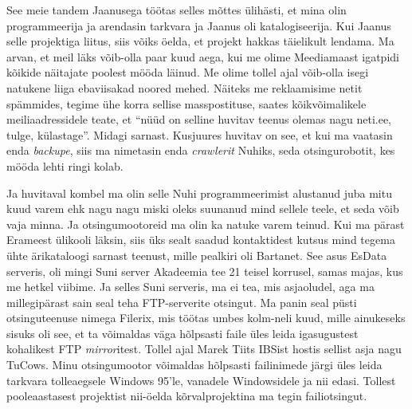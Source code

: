 
See meie tandem Jaanusega töötas selles mõttes ülihästi, et mina olin  
programmeerija ja arendasin tarkvara ja Jaanus oli  katalogiseerija.  Kui Jaanus 
selle projektiga liitus, siis võiks öelda, et projekt hakkas täielikult 
lendama. Ma arvan, et meil läks võib-olla paar kuud aega, kui me olime 
Meediamaast igatpidi kõikide näitajate poolest mööda läinud. 
Me olime tollel ajal võib-olla isegi natukene liiga ebaviisakad noored mehed. 
Näiteks me reklaamisime netit spämmides, tegime  ühe korra sellise 
masspostituse, saates kõikvõimalikele meiliaadressidele teate, et \enquote{nüüd 
on selline huvitav teenus olemas nagu neti.ee, tulge, külastage}. Midagi 
sarnast. Kusjuures huvitav on see, et kui ma vaatasin enda \emph{backupe}, siis 
ma nimetasin enda \emph{crawlerit} Nuhiks, seda otsingurobotit, kes mööda lehti 
ringi kolab. 

Ja huvitaval kombel ma olin selle Nuhi programmeerimist alustanud juba mitu kuud 
varem ehk nagu nagu miski oleks suunanud mind sellele teele, et seda võib vaja 
minna. Ja  otsingumootoreid ma olin ka natuke varem teinud. Kui ma pärast 
Erameest  ülikooli läksin, siis  üks sealt saadud kontaktidest kutsus mind 
tegema ühte ärikataloogi sarnast teenust,  mille pealkiri oli Bartanet. See 
asus EsData serveris, oli mingi Suni server Akadeemia tee 21  
teisel korrusel, samas majas, kus me hetkel viibime. Ja selles Suni serveris, 
ma ei tea, mis asjaoludel, aga ma millegipärast sain seal teha FTP-serverite 
otsingut. Ma panin seal püsti otsinguteenuse nimega Filerix, mis töötas umbes 
kolm-neli kuud, mille ainukeseks sisuks oli see, et ta võimaldas väga hõlpsasti 
faile üles leida igasugustest kohalikest FTP \emph{mirror}itest. Tollel ajal  
Marek Tiits IBSist 
hostis sellist asja nagu TuCows. Minu  otsingumootor 
võimaldas hõlpsasti failinimede järgi üles leida tarkvara tolleaegsele Windows 
95'le, vanadele Windowsidele ja nii edasi. Tollest pooleaastasest projektist nii-öelda kõrvalprojektina ma tegin failiotsingut.


